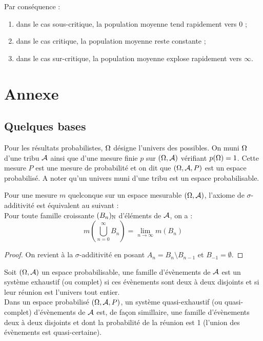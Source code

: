Par conséquence :
\begin{enumerate}
\item dans le cas sous-critique, la population moyenne tend rapidement vers 0 ;
\item dans le cas critique, la population moyenne reste constante ;
\item dans le cas sur-critique, la population moyenne explose rapidement vers $\infty$.
\end{enumerate}

\newpage

\section{Annexe}

\subsection{Quelques bases}

Pour les résultats probabilistes, $\Omega$ désigne l'univers des possibles. 
On muni $\Omega$ d'une tribu $\mathcal{A}$ ainsi que d'une mesure finie $p$ sur  $(\Omega, \mathcal{A})$ vérifiant $p(\Omega)=1$. 
Cette mesure $P$ est une mesure de probabilité et on dit que $(\Omega, \mathcal{A}, P)$ est un espace probabilisé. 
A noter qu'un univers muni d'une tribu est un espace probabilisable.

\begin{lem}
Pour une mesure $m$ quelconque sur un espace mesurable $(\Omega, \mathcal{A})$, l'axiome de $\sigma$-additivité est équivalent au suivant : \\
Pour toute famille croissante $(B_n)_{\mathbb{N}}$ d'éléments de $\mathcal{A}$, on a :
\[ m \left( \bigcup_{n=0} ^{\infty} B_n \right ) = \lim_{n \to \infty} m(B_n) \]
\end{lem}

\begin{proof}
On revient à la $\sigma$-additivité en posant $A_n = B_n \setminus B_{n-1}$ et $B_{-1} = \emptyset$.
\end{proof}

\begin{defn}
Soit $(\Omega, \mathcal{A})$ un espace probabilisable, une famille d'évènements de $\mathcal{A}$ est un système exhaustif (ou complet) si ces évènements
sont deux à deux disjoints et si leur réunion est l'univers tout entier. \\
Dans un espace probabilisé $(\Omega, \mathcal{A}, P)$, un système quasi-exhaustif (ou quasi-complet) d'évènements de $\mathcal{A}$ est, 
de façon simillaire, une famille d'évènements deux à deux disjoints et dont la probabilité de la réunion est 1
(l'union des évènements est quasi-certaine).
\end{defn}

